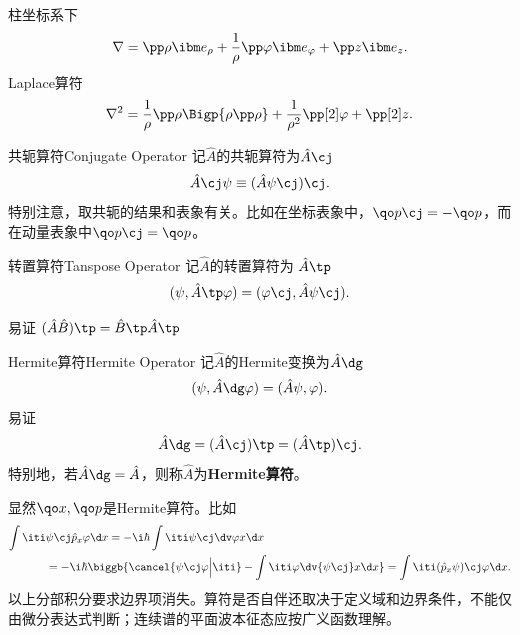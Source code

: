 	柱坐标系下
	\[
		\nabla=\pp\rho\ibm e_\rho+\frac1\rho\pp\varphi\ibm e_\varphi+\pp z\ibm e_z.
	\]
	Laplace算符
	\[
		\nabla^2=\frac1\rho\pp\rho\Bigp{\rho\pp\rho}+\frac1{\rho^2}\pp[2]\varphi+\pp[2]z.
	\]
\fi
\begin{definition}{共轭算符}{Conjugate Operator}
	记$\hat A$的共轭算符为$\hat A\cj$
	\[
		\hat A\cj\psi\equiv(\hat A\psi\cj)\cj.
	\]
	特别注意，取共轭的结果和表象有关。比如在坐标表象中，$\qo p\cj=-\qo p$，而在动量表象中$\qo p\cj=\qo p$。
\end{definition}
\begin{definition}{转置算符}{Tanspose Operator}
	记$\hat A$的转置算符为
	$\hat A\tp$
	\[
		(\psi,\hat A\tp\varphi)=(\varphi\cj,\hat A\psi\cj).
	\]
\end{definition}
易证
\((\hat A\hat B)\tp=\hat B\tp\hat A\tp\)
\begin{definition}{Hermite算符}{Hermite Operator}
	记$\hat A$的Hermite变换为$\hat A\dg$
	\[
		(\psi,\hat A\dg\varphi)=(\hat A\psi,\varphi).
	\]
	易证
	\[
		\hat A\dg=(\hat A\cj)\tp=(\hat A\tp)\cj.
	\]
	特别地，若$\hat A\dg=\hat A$，则称$\hat A$为\textbf{Hermite算符}。
\end{definition}
显然$\qo x,\qo p$是Hermite算符。比如
\begin{align*}
	\int\iti & \psi\cj\hat p_x\varphi\d x=-\i\hbar\int\iti\psi\cj\dv\varphi{x}\d x                                                                     \\
	         & =-\i\hbar\biggb{\cancel{\psi\cj\varphi{\Big\vert}\iti}-\int\iti\varphi\dv{\psi\cj}x\d x}=\int\iti(\hat p_x\psi)\cj\varphi\d x.
\end{align*}
以上分部积分要求边界项消失。算符是否自伴还取决于定义域和边界条件，不能仅由微分表达式判断；连续谱的平面波本征态应按广义函数理解。
